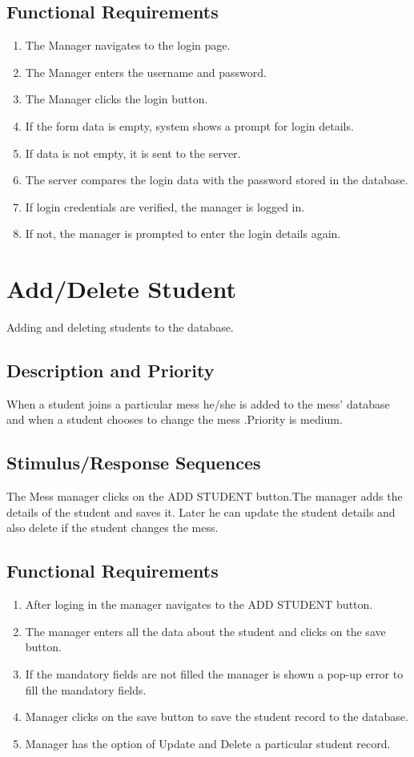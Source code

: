 \documentclass{scrreprt}
\begin{document}
\subsection{Functional Requirements}
\begin{enumerate}
\item The Manager navigates to the login page.
\item The Manager enters the username and password.
\item The Manager clicks the login button.
\item If the form data is empty, system shows a prompt
for login details.
\item If data is not empty, it is sent to the server.
\item The server compares the login data with the
password stored in the database.
\item If login credentials are verified, the manager is
logged in.
\item If not, the manager is prompted to enter the login
details again.
\end{enumerate}

\section{Add/Delete Student}
Adding and deleting students to the database.


\subsection{Description and Priority}
When a student joins a particular mess he/she is added to the mess' database and when a student chooses to change the mess .Priority is medium.

\subsection{Stimulus/Response Sequences}
The Mess manager clicks on the ADD STUDENT button.The manager adds the details of the student and saves it. Later he can update the student details and also delete if the student changes the mess. 

\subsection{Functional Requirements}
\begin{enumerate}
\item After loging in the manager navigates to the ADD STUDENT  button.
\item The manager enters all the data about the student and clicks on the save button.
\item If the mandatory fields are not filled the manager is shown a pop-up error to fill the mandatory fields.
\item Manager clicks on the save button to save the student record to the database.
\item Manager has the option of Update and Delete a particular student record.
\end{enumerate}
\end{document}
